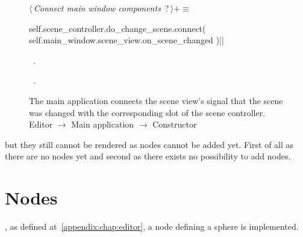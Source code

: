 \documentclass[%
    a4paper,    %
    justified,  %
    nobib,      %
    openany     %
]{tufte-book}
\begin{document}
\begin{figure}
\begin{flushleft} \small
\begin{minipage}{\linewidth}\label{scrap98}\raggedright\small
{} $\langle\,${\itshape Connect main window components}\nobreak\ {\footnotesize {?}}$\,\rangle+\equiv$
\vspace{-1ex}
\begin{pythoncode}
self.scene_controller.do_change_scene.connect(
    self.main_window.scene_view.on_scene_changed
)|\NWsep|
\end{pythoncode}
\vspace{1.5ex}
\footnotesize
\begin{list}{}{\setlength{\itemsep}{-\parsep}\setlength{\itemindent}{-\leftmargin}}
\item \NWtxtMacroDefBy\ .
\item \NWtxtMacroRefIn\ .

\item{}
\end{list}
\end{minipage}\vspace{4ex}
\end{flushleft}
\caption{The main application connects the scene view's signal that the scene
  was changed with the corresponding slot of the scene controller.
  \newline{}\newline{}Editor $\rightarrow$ Main application $\rightarrow$
  Constructor}
\label{editor:lst:main-application:constructor:connect-change-scene}
\end{figure}

 but they still
cannot be rendered as nodes cannot be added yet. First of all as there are no
nodes yet and second as there exists no possibility to add nodes.

\chapter{Nodes}
\label{appendix:chap:nodes}

, as defined
at~\autoref{appendix:chap:editor}, a node defining a sphere is implemented.
\end{document}
